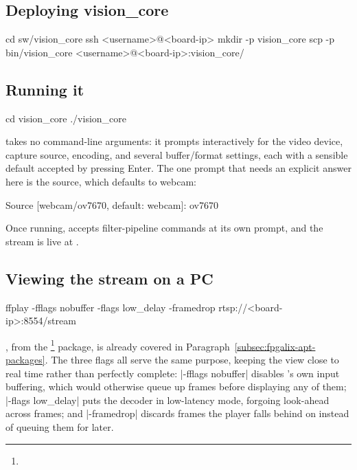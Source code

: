 \subsection{Deploying vision\_core}
\label{subsec:fpgalix-vision-deploy}

\begin{shellcodehost}
cd sw/vision_core
ssh <username>@<board-ip> mkdir -p vision_core
scp -p bin/vision_core <username>@<board-ip>:vision_core/
\end{shellcodehost}

\subsection{Running it}
\label{subsec:fpgalix-vision-run}

\begin{shellcodeboard}
cd vision_core
./vision_core
\end{shellcodeboard}

 takes no command-line arguments: it prompts interactively for the video device, capture source, encoding, and several buffer/format settings, each with a sensible default accepted by pressing Enter. The one prompt that needs an explicit answer here is the source, which defaults to webcam:

\begin{shellcodeboard}
Source [webcam/ov7670, default: webcam]: ov7670
\end{shellcodeboard}

Once running,  accepts filter-pipeline commands at its own prompt, and the  stream is live at .

\subsection{Viewing the stream on a PC}
\label{subsec:fpgalix-vision-viewing}

\begin{shellcodehost}
ffplay -fflags nobuffer -flags low_delay -framedrop rtsp://<board-ip>:8554/stream
\end{shellcodehost}

, from the \footnote{} package, is already covered in Paragraph~\ref{subsec:fpgalix-apt-packages}. The three flags all serve the same purpose, keeping the view close to real time rather than perfectly complete: |-fflags nobuffer| disables 's own input buffering, which would otherwise queue up frames before displaying any of them; |-flags low_delay| puts the decoder in low-latency mode, forgoing look-ahead across frames; and |-framedrop| discards frames the player falls behind on instead of queuing them for later.
